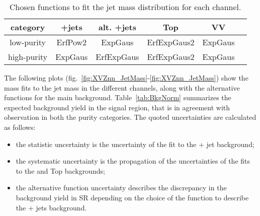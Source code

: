 \begin{table}[!htb]
  \begin{center}
    \begin{tabular}{c|ccccc}
      category & \V+jets & alt. \V+jets & Top & VV \\
      \hline
      \hline
      low-purity  & ErfPow2 & ExpGaus & ErfExpGaus2 & ExpGaus \\
      \hline
      high-purity & ExpGaus & ErfExpGaus & ErfExpGaus2 & ExpGaus \\
    \end{tabular}
  \end{center}
  \caption{Chosen functions to fit the jet mass distribution for each channel.}\label{tab:MassFunctions}
\end{table}



\noindent The following plots (fig.~\ref{fig:XVZnn_JetMass}-\ref{fig:XVZnn_JetMass}) show the mass fits to the jet mass in the different channels, along with the alternative functions for the main background. Table~\ref{tab:BkgNorm} summarizes the expected background yield in the signal region, that is in agreement with observation in both the purity categories. The quoted uncertainties are calculated as follows:
\begin{itemize}
\item the statistic uncertainty is the uncertainty of the fit to the \V + jet background;
\item the systematic uncertainty is the propagation of the uncertainties of the fits to the \V\V and Top backgrounds;
\item the alternative function uncertainty describes the discrepancy in the background yield in SR depending on the choice of the function to describe the \V + jets background.
\end{itemize}


